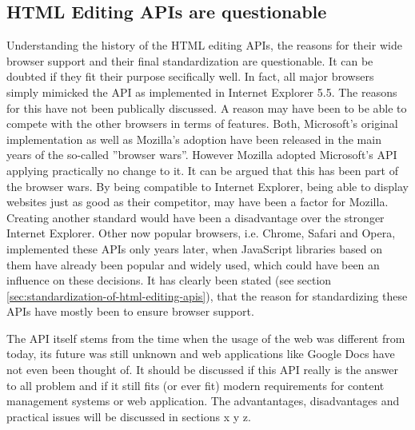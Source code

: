 \subsection{HTML Editing APIs are questionable}

Understanding the history of the HTML editing APIs, the reasons for their wide browser support and their final standardization are questionable. It can be doubted if they fit their purpose secifically well. In fact, all major browsers simply mimicked the API as implemented in Internet Explorer 5.5. The reasons for this have not been publically discussed. A reason may have been to be able to compete with the other browsers in terms of features. Both, Microsoft's original implementation as well as Mozilla's adoption have been released in the main years of the so-called ''browser wars''. However Mozilla adopted Microsoft's API applying practically no change to it. It can be argued that this has been part of the browser wars. By being compatible to Internet Explorer, being able to display websites just as good as their competitor, may have been a factor for Mozilla. Creating another standard would have been a disadvantage over the stronger Internet Explorer. Other now popular browsers, i.e. Chrome, Safari and Opera, implemented these APIs only years later, when JavaScript libraries based on them have already been popular and widely used, which could have been an influence on these decisions. It has clearly been stated (see section \ref{sec:standardization-of-html-editing-apis}), that the reason for standardizing these APIs have mostly been to ensure browser support.

The API itself stems from the time when the usage of the web was different from today, its future was still unknown and web applications like Google Docs have not even been thought of. It should be discussed if this API really is the answer to all problem and if it still fits (or ever fit) modern requirements for content management systems or web application. The advantantages, disadvantages and practical issues will be discussed in sections x y z.






